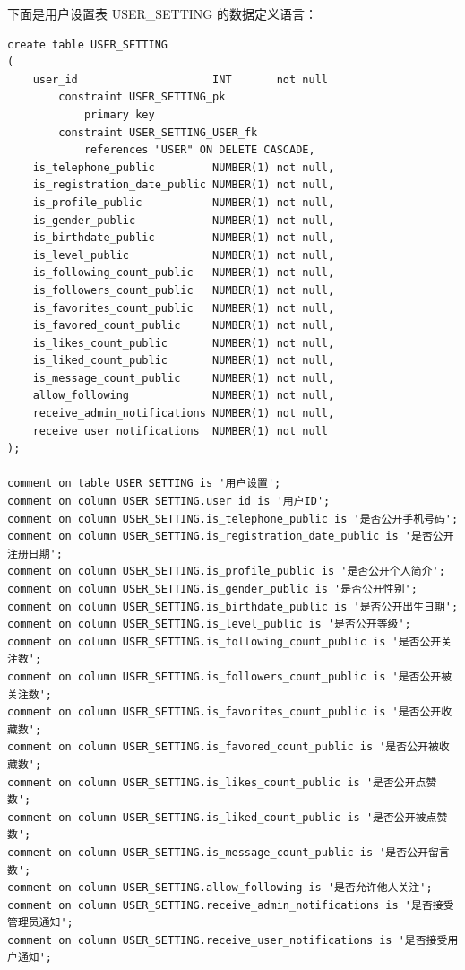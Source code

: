 下面是用户设置表 USER\_SETTING 的数据定义语言：

\begin{verbatim}
create table USER_SETTING
(
    user_id                     INT       not null
        constraint USER_SETTING_pk
            primary key
        constraint USER_SETTING_USER_fk
            references "USER" ON DELETE CASCADE,
    is_telephone_public         NUMBER(1) not null,
    is_registration_date_public NUMBER(1) not null,
    is_profile_public           NUMBER(1) not null,
    is_gender_public            NUMBER(1) not null,
    is_birthdate_public         NUMBER(1) not null,
    is_level_public             NUMBER(1) not null,
    is_following_count_public   NUMBER(1) not null,
    is_followers_count_public   NUMBER(1) not null,
    is_favorites_count_public   NUMBER(1) not null,
    is_favored_count_public     NUMBER(1) not null,
    is_likes_count_public       NUMBER(1) not null,
    is_liked_count_public       NUMBER(1) not null,
    is_message_count_public     NUMBER(1) not null,
    allow_following             NUMBER(1) not null,
    receive_admin_notifications NUMBER(1) not null,
    receive_user_notifications  NUMBER(1) not null
);

comment on table USER_SETTING is '用户设置';
comment on column USER_SETTING.user_id is '用户ID';
comment on column USER_SETTING.is_telephone_public is '是否公开手机号码';
comment on column USER_SETTING.is_registration_date_public is '是否公开注册日期';
comment on column USER_SETTING.is_profile_public is '是否公开个人简介';
comment on column USER_SETTING.is_gender_public is '是否公开性别';
comment on column USER_SETTING.is_birthdate_public is '是否公开出生日期';
comment on column USER_SETTING.is_level_public is '是否公开等级';
comment on column USER_SETTING.is_following_count_public is '是否公开关注数';
comment on column USER_SETTING.is_followers_count_public is '是否公开被关注数';
comment on column USER_SETTING.is_favorites_count_public is '是否公开收藏数';
comment on column USER_SETTING.is_favored_count_public is '是否公开被收藏数';
comment on column USER_SETTING.is_likes_count_public is '是否公开点赞数';
comment on column USER_SETTING.is_liked_count_public is '是否公开被点赞数';
comment on column USER_SETTING.is_message_count_public is '是否公开留言数';
comment on column USER_SETTING.allow_following is '是否允许他人关注';
comment on column USER_SETTING.receive_admin_notifications is '是否接受管理员通知';
comment on column USER_SETTING.receive_user_notifications is '是否接受用户通知';
\end{verbatim}

